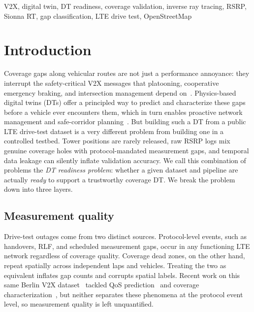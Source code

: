 \documentclass[conference]{IEEEtran}
\begin{document}
\begin{IEEEkeywords}
V2X, digital twin, DT readiness, coverage validation, inverse ray tracing,
RSRP, Sionna RT, gap classification, LTE drive test, OpenStreetMap
\end{IEEEkeywords}

\section{Introduction}
\label{sec:intro}

Coverage gaps along vehicular routes are not just a performance
annoyance: they interrupt the safety-critical V2X messages that
platooning, cooperative emergency braking, and intersection management
depend on~\cite{partani2025qos}.
Physics-based digital twins (DTs) offer a principled way to predict and
characterize these gaps before a vehicle ever encounters them, which in
turn enables proactive network management and safe-corridor
planning~\cite{teh2023dt,pegurri2025van3twin}.
But building such a DT from a public LTE drive-test dataset is a very
different problem from building one in a controlled testbed. Tower
positions are rarely released, raw RSRP logs mix genuine coverage holes
with protocol-mandated measurement gaps, and temporal data leakage can
silently inflate validation accuracy.
We call this combination of problems the \emph{DT readiness problem}:
whether a given dataset and pipeline are actually \emph{ready} to
support a trustworthy coverage DT. We break the problem down into
three layers.

\subsection*{Measurement quality}
Drive-test outages come from two distinct sources. Protocol-level
events, such as handovers, RLF, and scheduled measurement gaps, occur
in any functioning LTE network regardless of coverage quality. Coverage
dead zones, on the other hand, repeat spatially across independent laps
and vehicles. Treating the two as equivalent inflates gap counts and
corrupts spatial labels. Recent work on this same Berlin V2X
dataset~\cite{schiegg2022berlin} tackled QoS
prediction~\cite{partani2025qos} and coverage
characterization~\cite{teh2023dt}, but neither separates these
phenomena at the protocol event level, so measurement quality is left
unquantified.
\end{document}
